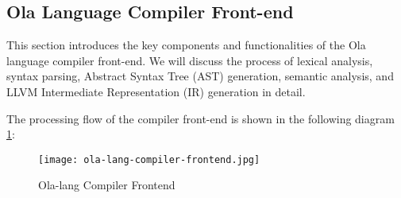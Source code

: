 \subsection{Ola Language Compiler Front-end}

This section introduces the key components and functionalities of the Ola language compiler front-end. We will discuss the process of lexical analysis, syntax parsing, Abstract Syntax Tree (AST) generation, semantic analysis, and LLVM Intermediate Representation (IR) generation in detail.

The processing flow of the compiler front-end is shown in the following diagram \ref{fig:ola-lang-compiler-frontend}:

\begin{figure}[!ht]
    \centering
    \texttt{[image: ola-lang-compiler-frontend.jpg]}
    \caption{Ola-lang Compiler Frontend}
    \label{fig:ola-lang-compiler-frontend}
\end{figure}





